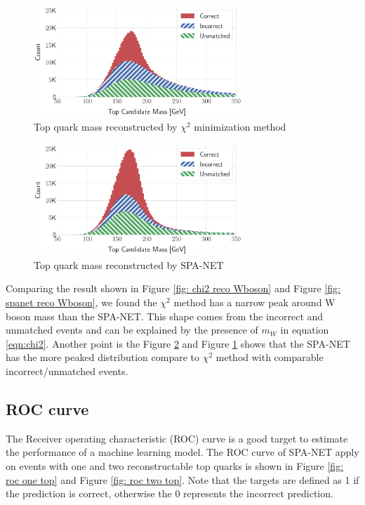 \begin{figure}[H]
	\centering
	\includegraphics[width=0.7\textwidth]{Figures/network_t_quark_stacked_chi2.pdf}
	\caption{ Top quark mass reconstructed by $\chi^{2}$ minimization method}
	\label{fig: chi2 reco t quark}
\end{figure}
\begin{figure}[H]
	\centering
	\includegraphics[width=0.7\textwidth]{Figures/network_t_quark_stacked.pdf}
	\caption{ Top quark mass reconstructed by SPA-NET}
	\label{fig: spanet reco t quark}
\end{figure}
Comparing the result shown in Figure \ref{fig: chi2 reco Wboson} and Figure \ref{fig: spanet reco Wboson}, we found the $\chi^{2}$ method has a narrow peak around W boson mass than the SPA-NET. This shape comes from the incorrect and unmatched events and can be explained by the presence of $m_{W}$ in equation \ref{eqn:chi2}. Another point is the Figure \ref{fig: spanet reco t quark} and Figure \ref{fig: chi2 reco t quark} shows that the SPA-NET has the more peaked distribution compare to $\chi^{2}$ method with comparable incorrect/unmatched events.

\subsection{ROC curve}\label{sebsec:roc}

The Receiver operating characteristic (ROC) curve is a good target to estimate the performance of a machine learning model. The ROC curve of SPA-NET apply on events with one and two reconstructable top quarks is shown in Figure \ref{fig: roc one top} and Figure \ref{fig: roc two top}. Note that the targets are defined as 1 if the prediction is correct, otherwise the 0 represents the incorrect prediction.

